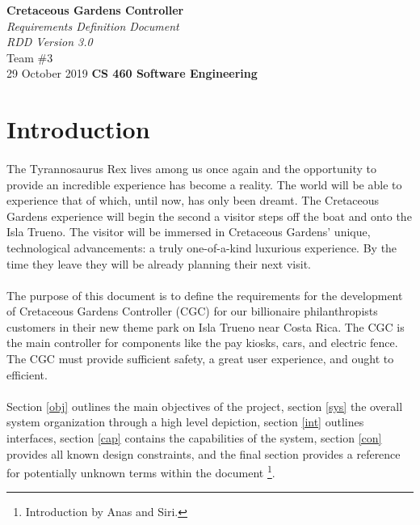 \documentclass[12pt]{article}
\begin{document}
\begin{titlepage}
\begin{flushleft}
\vspace*{1cm}
\Huge
\textbf{Cretaceous Gardens Controller}\\
\vspace{1cm}
\Huge
\textit{Requirements Definition Document}\\
\vspace{1cm}
\Large
\textit{RDD Version 3.0}\\
\vspace{5cm}
\LARGE
Team \#3\\
29 October 2019
\vfill
\Huge
\textbf{CS 460 Software Engineering}
\end{flushleft}
\end{titlepage}
\normalsize
\tableofcontents
\newpage
\section{Introduction}
\paragraph{} The Tyrannosaurus Rex lives among us once again and the opportunity 
to provide an incredible experience has become a reality. The world will be able 
to experience that of which, until now, has only been dreamt. The Cretaceous Gardens
experience will begin the second a visitor steps off the boat and onto the Isla 
Trueno. The visitor will be immersed in Cretaceous Gardens' unique, technological 
advancements: a truly one-of-a-kind luxurious experience. By the time they leave 
they will be already planning their next visit. 

\paragraph{} The purpose of this document is to define the requirements for the 
development of Cretaceous Gardens Controller (CGC) for our billionaire philanthropists 
customers in their new theme park on Isla Trueno near Costa Rica. The CGC is the main 
controller for components like the pay kiosks, cars, and electric fence. The CGC must 
provide sufficient safety, a great user experience, and ought to efficient.

\paragraph{}  Section \ref{obj} outlines the main objectives of the project, 
section \ref{sys} the overall system organization through a high level depiction, 
section \ref{int} outlines interfaces, section \ref{cap} contains the capabilities 
of the system, section \ref{con} provides all known design constraints, and the 
final section provides a reference for potentially unknown terms within the document 
\footnote{Introduction by Anas and Siri.}.  
\end{document}
